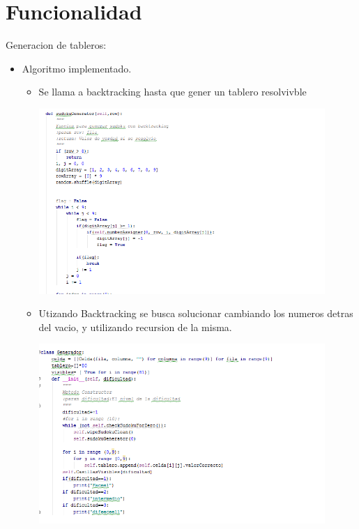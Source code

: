 \documentclass[12pt,oneside]{book}
\begin{document}
\chapter{Funcionalidad}
\begin{center} Generacion de tableros:\end{center}
\begin{itemize}
\item  Algoritmo implementado.
\begin{itemize}
	\item Se llama a backtracking hasta que gener un tablero resolvivble

	\includegraphics[width=0.9\textwidth]{./imagenes/Codigo_backtrcking.png}

	\item Utizando Backtracking se busca solucionar cambiando los numeros detras del vacio, y utilizando recursion de la misma.

	\includegraphics[width=0.9\textwidth]{./imagenes/codigo_genrador.png}

\end {itemize}


\end{itemize}
\end{document}

